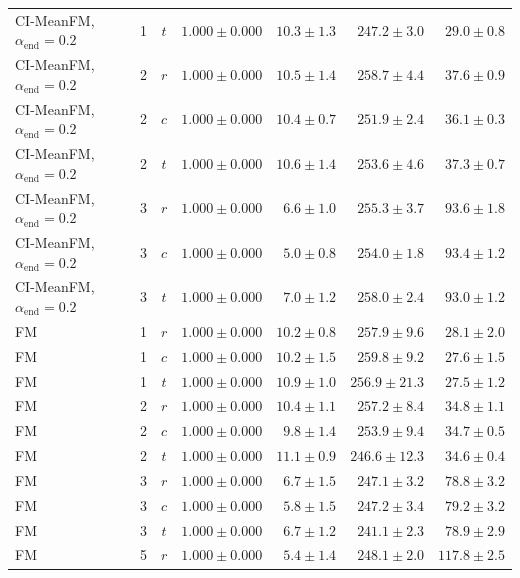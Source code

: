 \begin{table}[htpb]
\begin{tabularx}{\linewidth}{@{}L r c rrrr@{}}
    CI-MeanFM, $\alpha_{\mathrm{end}}=0.2$ & 1 & $t$ & $1.000 \pm 0.000$ & $10.3 \pm 1.3$ & $247.2 \pm 3.0$ & $29.0 \pm 0.8$ \\
    \addlinespace[2pt]
    CI-MeanFM, $\alpha_{\mathrm{end}}=0.2$ & 2 & $r$ & $1.000 \pm 0.000$ & $10.5 \pm 1.4$ & $258.7 \pm 4.4$ & $37.6 \pm 0.9$ \\
    CI-MeanFM, $\alpha_{\mathrm{end}}=0.2$ & 2 & $c$ & $1.000 \pm 0.000$ & $10.4 \pm 0.7$ & $251.9 \pm 2.4$ & $36.1 \pm 0.3$ \\
    CI-MeanFM, $\alpha_{\mathrm{end}}=0.2$ & 2 & $t$ & $1.000 \pm 0.000$ & $10.6 \pm 1.4$ & $253.6 \pm 4.6$ & $37.3 \pm 0.7$ \\
    \addlinespace[2pt]
    CI-MeanFM, $\alpha_{\mathrm{end}}=0.2$ & 3 & $r$ & $1.000 \pm 0.000$ & $6.6 \pm 1.0$ & $255.3 \pm 3.7$ & $93.6 \pm 1.8$ \\
    CI-MeanFM, $\alpha_{\mathrm{end}}=0.2$ & 3 & $c$ & $1.000 \pm 0.000$ & $5.0 \pm 0.8$ & $254.0 \pm 1.8$ & $93.4 \pm 1.2$ \\
    CI-MeanFM, $\alpha_{\mathrm{end}}=0.2$ & 3 & $t$ & $1.000 \pm 0.000$ & $7.0 \pm 1.2$ & $258.0 \pm 2.4$ & $93.0 \pm 1.2$ \\
    \addlinespace[2pt]
    FM & 1 & $r$ & $1.000 \pm 0.000$ & $10.2 \pm 0.8$ & $257.9 \pm 9.6$ & $28.1 \pm 2.0$ \\
    FM & 1 & $c$ & $1.000 \pm 0.000$ & $10.2 \pm 1.5$ & $259.8 \pm 9.2$ & $27.6 \pm 1.5$ \\
    FM & 1 & $t$ & $1.000 \pm 0.000$ & $10.9 \pm 1.0$ & $256.9 \pm 21.3$ & $27.5 \pm 1.2$ \\
    \addlinespace[2pt]
    FM & 2 & $r$ & $1.000 \pm 0.000$ & $10.4 \pm 1.1$ & $257.2 \pm 8.4$ & $34.8 \pm 1.1$ \\
    FM & 2 & $c$ & $1.000 \pm 0.000$ & $9.8 \pm 1.4$ & $253.9 \pm 9.4$ & $34.7 \pm 0.5$ \\
    FM & 2 & $t$ & $1.000 \pm 0.000$ & $11.1 \pm 0.9$ & $246.6 \pm 12.3$ & $34.6 \pm 0.4$ \\
    \addlinespace[2pt]
    FM & 3 & $r$ & $1.000 \pm 0.000$ & $6.7 \pm 1.5$ & $247.1 \pm 3.2$ & $78.8 \pm 3.2$ \\
    FM & 3 & $c$ & $1.000 \pm 0.000$ & $5.8 \pm 1.5$ & $247.2 \pm 3.4$ & $79.2 \pm 3.2$ \\
    FM & 3 & $t$ & $1.000 \pm 0.000$ & $6.7 \pm 1.2$ & $241.1 \pm 2.3$ & $78.9 \pm 2.9$ \\
    \addlinespace[2pt]
    FM & 5 & $r$ & $1.000 \pm 0.000$ & $5.4 \pm 1.4$ & $248.1 \pm 2.0$ & $117.8 \pm 2.5$ \\

\end{tabularx}
\end{table}
